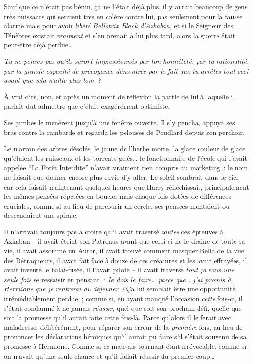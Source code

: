 Sauf que ce n'était pas bénin, ça ne l'était déjà plus, il y aurait beaucoup de gens très puissants qui seraient très en colère contre lui, pas seulement pour la fausse alarme mais pour avoir \emph{libéré Bellatrix Black d'Azkaban}, et si le Seigneur des Ténèbres existait \emph{vraiment} et s'en prenait à lui plus tard, alors la guerre était peut-être déjà perdue…

\emph{Tu ne penses pas qu'ils seront impressionnés par ton honnêteté, par ta rationalité, par ta grande capacité de prévoyance démontrée par le fait que tu arrêtes tout ceci avant que cela n'aille plus loin~?}

À vrai dire, non, et après un moment de réflexion la partie de lui à laquelle il parlait dut admettre que c'était exagérément optimiste.

Ses jambes le menèrent jusqu'à une fenêtre ouverte.
Il s'y pencha, appuya ses bras contre la rambarde et regarda les pelouses de Poudlard depuis son perchoir.

Le marron des arbres désolés, le jaune de l'herbe morte, la glace couleur de glace qu'étaient les ruisseaux et les torrents gelés… le fonctionnaire de l'école qui l'avait appelée “La Forêt Interdite” n'avait vraiment rien compris au marketing~: le nom ne faisait que donner encore plus envie d'y aller.
Le soleil sombrait dans le ciel car cela faisait maintenant quelques heures que Harry réfléchissait, principalement les mêmes pensées répétées en boucle, mais chaque fois dotées de différences cruciales, comme si au lieu de parcourir un cercle, ses pensées montaient ou descendaient une spirale.

Il n'arrivait toujours pas à croire qu'il avait traversé \emph{toutes} ces épreuves à Azkaban -- il avait éteint son Patronus avant que celui-ci ne le draine de toute sa vie, il avait assommé un Auror, il avait trouvé comment masquer Bella de la vue des Détraqueurs, il avait fait face à douze de ces créatures et les avait effrayées, il avait inventé le balai-fusée, il l'avait piloté -- il avait traversé \emph{tout ça} sans \emph{une seule fois} se ressaisir en pensant~: \emph{Je dois le faire… parce que… j'ai promis à Hermione que je rentrerai du déjeuner~!} Ça lui semblait être une opportunité irrémédiablement perdue~; comme si, en ayant manqué l'occasion \emph{cette} fois-ci, il s'était condamné à ne jamais \emph{réussir}, quel que soit son prochain défi, quelle que soit la promesse qu'il aurait faite cette fois-là.
Parce qu'alors il le ferait avec maladresse, délibérément, pour réparer son erreur de la \emph{première} fois, au lieu de prononcer les déclarations héroïques qu'il aurait pu faire s'il s'était souvenu de sa promesse à Hermione.
Comme si ce mauvais tournant était irrévocable, comme si on n'avait qu'une seule chance et qu'il fallait réussir du premier coup…

